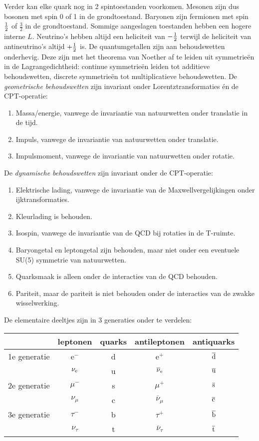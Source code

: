 Verder kan elke quark nog in 2 spintoestanden voorkomen. Mesonen zijn dus
bosonen met spin 0 of 1 in de grondtoestand. Baryonen zijn fermionen met spin
$\mbox{$\frac{1}{2}$}$ of $\frac{3}{2}$ in de grondtoestand. Sommige aangeslagen toestanden
hebben een hogere interne $L$. Neutrino's hebben altijd een heliciteit van
$-\mbox{$\frac{1}{2}$}$ terwijl de heliciteit van antineutrino's altijd $+\mbox{$\frac{1}{2}$}$ is.
\npar
De quantumgetallen zijn aan behoudswetten onderhevig. Deze zijn met het
theorema van Noether af te leiden uit symmetrie\"en in de Lagrangedichtheid:
continue symmetrie\"en leiden tot additieve behoudswetten, discrete
symmetrie\"en tot multiplicatieve behoudswetten.
\npar
De {\it geometrische behoudswetten} zijn invariant onder Lorentztransformaties
\'en de CPT-operatie:
\begin{enumerate}
\item Massa/energie, vanwege de invariantie van natuurwetten onder translatie in de tijd.
\item Impuls, vanwege de invariantie van natuurwetten onder translatie.
\item Impulsmoment, vanwege de invariantie van natuurwetten onder rotatie.
\end{enumerate}
De {\it dynamische behoudswetten} zijn invariant onder de CPT-operatie:
\begin{enumerate}
\item Elektrische lading, vanwege de invariantie van de Maxwellvergelijkingen
      onder ijktransformaties.
\item Kleurlading is behouden.
\item Isospin, vanwege de invariantie van de QCD bij rotaties in de T-ruimte.
\item Baryongetal en leptongetal zijn behouden, maar niet onder een eventuele
      SU(5) symmetrie van natuurwetten.
\item Quarksmaak is alleen onder de interacties van de QCD behouden.
\item Pariteit, maar de pariteit is niet behouden onder de interacties van
      de zwakke wisselwerking.
\end{enumerate}
De elementaire deeltjes zijn in 3 generaties onder te verdelen:
\begin{center}
\begin{tabular}{||l|c|c|c|c||}
\hline
&leptonen&quarks&antileptonen&antiquarks\\
\hline
1e generatie&e$^-$ &d&e$^+$&$\overline{\rm d}$\rule{0pt}{12pt}\\
 &$\nu_{\rm e}$&u&$\overline{\nu}_{\rm e}$&$\overline{\rm u}$\\
\hline
2e generatie&$\mu^-$ &s&$\mu^+$&$\overline{\rm s}$\rule{0pt}{12pt}\\
 &$\nu_\mu$&c&$\overline{\nu}_\mu$&$\overline{\rm c}$\\
\hline
3e generatie&$\tau^-$ &b&$\tau^+$&$\overline{\rm b}$\rule{0pt}{12pt}\\
 &$\nu_\tau$&t&$\overline{\nu}_\tau$&$\overline{\rm t}$\\
\hline
\end{tabular}
\end{center}
